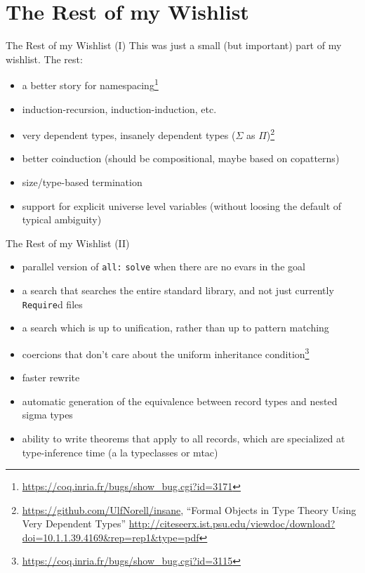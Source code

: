 \documentclass{beamer}
\begin{document}
\section{The Rest of my Wishlist}


\begin{frame}{The Rest of my Wishlist (I)}
This was just a small (but important) part of my wishlist.  The rest:

\begin{itemize}
  \item
    a better story for namespacing\footnote{\url{https://coq.inria.fr/bugs/show\_bug.cgi?id=3171}}
  \item 
    induction-recursion, induction-induction, etc.
  \item
    very dependent types, insanely dependent types ($\Sigma$ as $\Pi$)\footnote{\url{https://github.com/UlfNorell/insane}, ``Formal Objects in Type Theory Using Very Dependent Types'' \url{http://citeseerx.ist.psu.edu/viewdoc/download?doi=10.1.1.39.4169&rep=rep1&type=pdf}}
  \item 
    better coinduction (should be compositional, maybe based on copatterns)
  \item 
    size/type-based termination
  \item 
    support for explicit universe level variables (without loosing the default of typical ambiguity)
\end{itemize}
\end{frame}

\begin{frame}{The Rest of my Wishlist (II)}
\begin{itemize}
  \item
    parallel version of \texttt{all:} \texttt{solve} when there are no evars in the goal
  \item 
    a search that searches the entire standard library, and not just currently \texttt{Require}d files
  \item 
    a search which is up to unification, rather than up to pattern matching
  \item 
    coercions that don't care about the uniform inheritance condition\footnote{\url{https://coq.inria.fr/bugs/show\_bug.cgi?id=3115}}
  \item 
    faster rewrite
  \item 
    automatic generation of the equivalence between record types and nested sigma types
  \item 
    ability to write theorems that apply to all records, which are specialized at type-inference time (a la typeclasses or mtac)
\end{itemize}
\end{frame}
\end{document}
